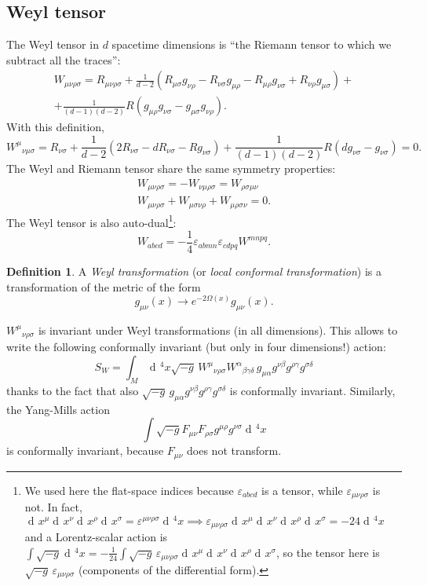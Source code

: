 \documentclass[a4paper,12pt]{book}
\newcommand{\dd}{\mathop{\mathrm{d}\!}{}}
\renewcommand{\epsilon}{\varepsilon}
\theoremstyle{definition}
\newtheorem{definition}{Definition}
\theoremstyle{remark}
\begin{document}
\subsection{Weyl tensor}
The Weyl tensor in $d$ spacetime dimensions is ``the Riemann tensor to which we subtract all the traces'':
\begin{multline*}W_{\mu\nu\rho\sigma}=R_{\mu\nu\rho\sigma}+\frac1{d-2}(R_{\mu\sigma}g_{\nu\rho}-R_{\nu\sigma}g_{\mu\rho}-R_{\mu\rho}g_{\nu\sigma}+R_{\nu\rho}g_{\mu\sigma})+\\+\frac1{(d-1)(d-2)}R(g_{\mu\rho}g_{\nu\sigma}-g_{\mu\sigma}g_{\nu\rho}).\end{multline*}
With this definition,
\[W^\mu{}_{\nu\mu\sigma}=R_{\nu\sigma}+\frac1{d-2}(2R_{\nu\sigma}-dR_{\nu\sigma}-Rg_{\nu\sigma})+\frac1{(d-1)(d-2)}R(dg_{\nu\sigma}-g_{\nu\sigma})=0.\]
The Weyl and Riemann tensor share the same symmetry properties:
\begin{gather*}
W_{\mu\nu\rho\sigma}=-W_{\nu\mu\rho\sigma}=W_{\rho\sigma\mu\nu}\\
W_{\mu\nu\rho\sigma}+W_{\mu\sigma\nu\rho}+W_{\mu\rho\sigma\nu}=0.
\end{gather*}
The Weyl tensor is also auto-dual\footnote{We used here the flat-space indices because $\epsilon_{abcd}$ is a tensor, while $\epsilon_{\mu\nu\rho\sigma}$ is not. In fact, $\dd x^\mu\dd x^\nu\dd x^\rho\dd x^\sigma=\epsilon^{\mu\nu\rho\sigma}\dd^4x\implies\epsilon_{\mu\nu\rho\sigma}\dd x^\mu\dd x^\nu\dd x^\rho\dd x^\sigma=-24\dd^4x$ and a Lorentz-scalar action is $\int\sqrt{-g}\dd^4x=-\frac1{24}\int\sqrt{-g}\,\epsilon_{\mu\nu\rho\sigma}\dd x^\mu\dd x^\nu\dd x^\rho\dd x^\sigma$, so the tensor here is $\sqrt{-g}\,\epsilon_{\mu\nu\rho\sigma}$ (components of the differential form).}:
\[W_{abcd}=-\frac14\epsilon_{abmn}\epsilon_{cdpq}W^{mnpq}.\]

\begin{definition}
A \emph{Weyl transformation} (or \emph{local conformal transformation}) is a transformation of the metric of the form
\[g_{\mu\nu}(x)\longrightarrow e^{-2\Omega(x)}g_{\mu\nu}(x).\]
\end{definition}

$W^\mu{}_{\nu\rho\sigma}$ is invariant under Weyl transformations (in all dimensions). This allows to write the following conformally invariant (but only in four dimensions!) action:
\[S_W=\int_M\dd^4x\sqrt{-g}\,W^\mu{}_{\nu\rho\sigma}W^\alpha{}_{\beta\gamma\delta}\,g_{\mu\alpha}g^{\nu\beta}g^{\rho\gamma}g^{\sigma\delta}\]
thanks to the fact that also $\sqrt{-g}\,g_{\mu\alpha}g^{\nu\beta}g^{\rho\gamma}g^{\sigma\delta}$ is conformally invariant. Similarly, the Yang-Mills action
\[\int\sqrt{-g}F_{\mu\nu}F_{\rho\sigma}g^{\mu\rho}g^{\nu\sigma}\dd^4x\]
is conformally invariant, because $F_{\mu\nu}$ does not transform.
\end{document}
